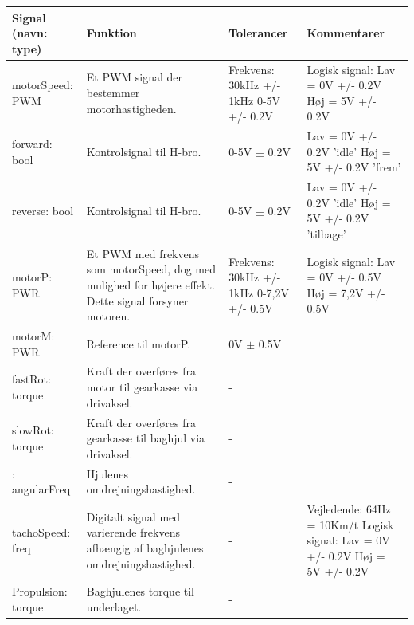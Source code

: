 \begin{table}[h]
	\centering
	\begin{tabularx}{\textwidth}{|l|X|X|X|} \hline
	\textbf{Signal (navn: type)} & \textbf{Funktion} & \textbf{Tolerancer} & \textbf{Kommentarer} \\ \hline
motorSpeed: PWM
	& Et PWM signal der bestemmer motorhastigheden. 
	& Frekvens: 30kHz +/- 1kHz 0-5V +/- 0.2V
 	& Logisk signal: \newline
		Lav = 0V +/- 0.2V \newline
		Høj = 5V +/- 0.2V
	\\ \hline

forward: bool
	& Kontrolsignal til H-bro.
	& 0-5V $\pm$ 0.2V
	& Lav = 0V +/- 0.2V  ’idle’ \newline
		Høj =  5V +/- 0.2V  ’frem’
	\\ \hline
	
reverse: bool
	& Kontrolsignal til H-bro.
	& 0-5V $\pm$ 0.2V
	& Lav = 0V +/- 0.2V ’idle’ \newline
		Høj =  5V +/- 0.2V  ’tilbage’
	\\ \hline
	
motorP: PWR
	& Et PWM med frekvens som motorSpeed, dog med mulighed for højere effekt. Dette signal forsyner motoren.
	& Frekvens: 30kHz +/- 1kHz 0-7,2V +/- 0.5V

 	& Logisk signal: \newline
		Lav = 0V +/- 0.5V \newline 
		Høj = 7,2V +/- 0.5V
	\\ \hline

motorM: PWR
	& Reference til motorP.
	& 0V $\pm$ 0.5V
	& ~
	\\ \hline
	
fastRot: torque
	& Kraft der overføres fra motor til gearkasse via drivaksel.
	& - 
	& ~
	\\ \hline
	
slowRot: torque
	& Kraft der overføres fra gearkasse til baghjul via drivaksel.
	& - 
	& ~
	\\ \hline
	
: angularFreq
	& Hjulenes omdrejningshastighed.
	& - 
	& ~
	\\ \hline
	
tachoSpeed: freq
	& Digitalt signal med varierende frekvens afhængig af baghjulenes 					omdrejningshastighed.
	& - 
	& Vejledende: \newline
		64Hz = 10Km/t \newline
		Logisk signal: \newline
		Lav = 0V +/- 0.2V \newline
		Høj = 5V +/- 0.2V

	\\ \hline
	
Propulsion: torque
	& Baghjulenes torque til underlaget.
	& - 
	& ~
	\\ \hline
	\end{tabularx}
\end{table}